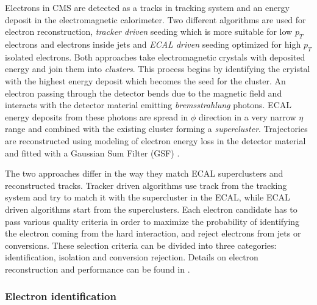 Electrons in CMS are detected as a tracks in tracking system and an energy deposit in the electromagnetic calorimeter. Two different algorithms are used for electron reconstruction, \textit{tracker driven} seeding which is more suitable for low $p_T$ electrons and electrons inside jets and \textit{ECAL driven} seeding optimized for high $p_T$ isolated electrons. Both approaches take electromagnetic crystals with deposited energy and join them into \textit{clusters}. This process begins by identifying the cryistal with the highest energy deposit which becomes the seed for the cluster. An electron passing through the detector bends due to the magnetic field and interacts with the detector material emitting \textit{bremsstrahlung} photons. ECAL energy deposits from these photons are spread in $\phi$ direction in a very narrow $\eta$ range and combined with the existing cluster forming a \textit{supercluster}. Trajectories are reconstructed using modeling of electron energy loss in the detector material and fitted with a Gaussian Sum Filter (GSF) \cite{2005JPhG31N9A}.
\par The two approaches differ in the way they match ECAL superclusters and reconstructed tracks. Tracker driven algorithms use track from the tracking system and try to match it with the supercluster in the ECAL, while ECAL driven algorithms start from the superclusters.
Each electron candidate has to pass various quality criteria in order to maximize the probability of identifying the electron coming from the hard interaction, and reject electrons from jets or conversions. These selection criteria can be divided into three categories: identification, isolation and conversion rejection. Details on electron reconstruction and performance can be found in \cite{CMS:2010bta}.

\subsubsection*{Electron identification}
\label{sec:eleID}

